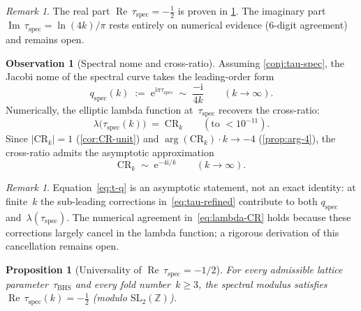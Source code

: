 \documentclass[11pt,a4paper]{article}
\theoremstyle{plain}
\newtheorem{proposition}[theorem]{Proposition}
\theoremstyle{definition}
\newtheorem{observation}[theorem]{Observation}
\theoremstyle{remark}
\newtheorem{remark}[theorem]{Remark}
\DeclareMathOperator{\Real}{Re}
\DeclareMathOperator{\Imag}{Im}
\newcommand{\ZZ}{\mathbb{Z}}
\newcommand{\ee}{\mathrm{e}}
\newcommand{\ii}{\mathrm{i}}
\begin{document}
\begin{remark}
The real part $\Real\,\tau_{\mathrm{spec}} = -\tfrac12$ is
proven in \cref{prop:tau-univ}.  The imaginary part
$\Imag\,\tau_{\mathrm{spec}} = \ln(4k)/\pi$ rests entirely on
numerical evidence ($6$-digit agreement) and remains open.
\end{remark}

\begin{observation}[Spectral nome and cross-ratio]
\label{cor:q-spec}
Assuming \cref{conj:tau-spec}, the Jacobi nome of the spectral curve
takes the leading-order form
\begin{equation}\label{eq:q-spec}
  q_{\mathrm{spec}}(k)
  \;:=\; \ee^{\ii\pi\tau_{\mathrm{spec}}}
  \;\sim\; \frac{-\ii}{4k}
  \qquad (k \to \infty).
\end{equation}
Numerically, the elliptic lambda function at~$\tau_{\mathrm{spec}}$
recovers the cross-ratio:
\begin{equation}\label{eq:lambda-CR}
  \lambda\!\bigl(\tau_{\mathrm{spec}}(k)\bigr)
  \;=\; \mathrm{CR}_k
  \qquad (\text{to } < 10^{-11}).
\end{equation}
Since $\lvert\mathrm{CR}_k\rvert = 1$ (\cref{cor:CR-unit})
and $\arg(\mathrm{CR}_k) \cdot k \to -4$ (\cref{prop:arg-4}),
the cross-ratio admits the asymptotic approximation
\begin{equation}\label{eq:t-q}
  \mathrm{CR}_k
  \;\sim\; \ee^{-4\ii/k}
  \qquad (k \to \infty).
\end{equation}
\end{observation}
\begin{remark}
  Equation~\eqref{eq:t-q} is an asymptotic statement, not an
  exact identity: at finite~$k$ the sub-leading corrections
  in~\eqref{eq:tau-refined} contribute to both
  $q_{\mathrm{spec}}$ and~$\lambda(\tau_{\mathrm{spec}})$.
  The numerical agreement in~\eqref{eq:lambda-CR}
  holds because these corrections largely cancel
  in the lambda function; a rigorous derivation of this
  cancellation remains open.
\end{remark}

\begin{proposition}[Universality of $\Real\,\tau_{\mathrm{spec}} = -1/2$]
\label{prop:tau-univ}
For every admissible lattice parameter~$\tau_{\mathrm{BHS}}$
and every fold number~$k \ge 3$, the spectral modulus satisfies
$\Real\,\tau_{\mathrm{spec}}(k) = -\tfrac12$ \textup{(}modulo
$\mathrm{SL}_2(\ZZ)$\textup{)}.
\end{proposition}
\end{document}
